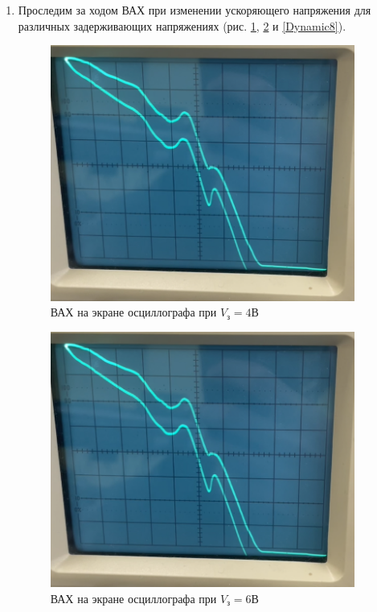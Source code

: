 \documentclass[12pt,a4paper]{article}
\begin{document}
    \begin{enumerate}

        \item Проследим за ходом ВАХ при изменении ускоряющего напряжения для различных задерживающих напряжениях (рис. \ref{Dynamic4}, \ref{Dynamic6} и \ref{Dynamic8}).

        \begin{figure}[h!]
 			\centering
 			\includegraphics[width=10cm]{src/uno.png}
 			\caption{ВАХ на экране осциллографа при $V_\text{з} = 4 \text{В}$}
            \label{Dynamic4}
 		\end{figure}

        \begin{figure}[h!]
 			\centering
 			\includegraphics[width=10cm]{src/uno.png}
 			\caption{ВАХ на экране осциллографа при $V_\text{з} = 6 \text{В}$}
            \label{Dynamic6}
 		\end{figure}


\end{enumerate}
\end{document}
